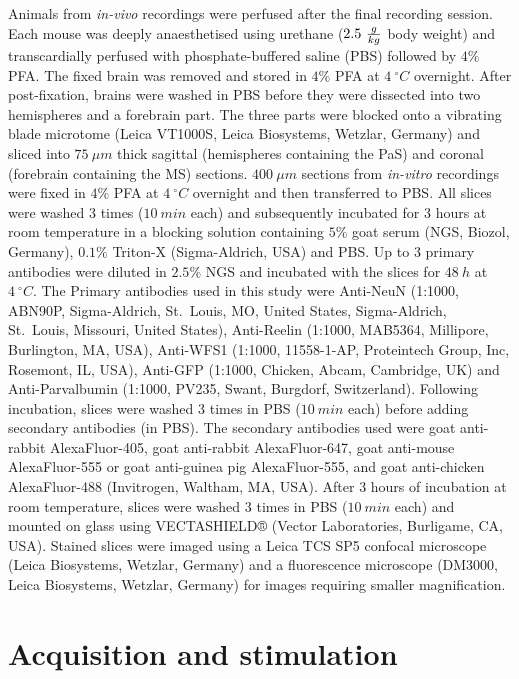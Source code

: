 \documentclass[
  12pt,
  a4paper,
  openany]{book}
\begin{document}
Animals from \emph{in-vivo} recordings were perfused after the final recording session. Each mouse was deeply anaesthetised using urethane (\(2.5\ \frac{g}{kg} \textstyle\) body weight) and transcardially perfused with phosphate-buffered saline (PBS) followed by \(4\%\) PFA. The fixed brain was removed and stored in \(4\%\) PFA at \(4\ ^{\circ}C\) overnight. After post-fixation, brains were washed in PBS before they were dissected into two hemispheres and a forebrain part. The three parts were blocked onto a vibrating blade microtome (Leica VT1000S, Leica Biosystems, Wetzlar, Germany) and sliced into \(75\ \mu m\) thick sagittal (hemispheres containing the PaS) and coronal (forebrain containing the MS) sections. \(400\ \mu m\) sections from \emph{in-vitro} recordings were fixed in \(4\%\) PFA at \(4\ ^{\circ}C\) overnight and then transferred to PBS. All slices were washed \(3\) times (\(10\ min\) each) and subsequently incubated for \(3\) hours at room temperature in a blocking solution containing \(5\%\) goat serum (NGS, Biozol, Germany), \(0.1\%\) Triton-X (Sigma-Aldrich, USA) and PBS. Up to \(3\) primary antibodies were diluted in \(2.5\%\) NGS and incubated with the slices for \(48\ h\) at \(4\ ^{\circ}C\). The Primary antibodies used in this study were Anti-NeuN (1:1000, ABN90P, Sigma-Aldrich, St.~Louis, MO, United States, Sigma-Aldrich, St.~Louis, Missouri, United States), Anti-Reelin (1:1000, MAB5364, Millipore, Burlington, MA, USA), Anti-WFS1 (1:1000, 11558-1-AP, Proteintech Group, Inc, Rosemont, IL, USA), Anti-GFP (1:1000, Chicken, Abcam, Cambridge, UK) and Anti-Parvalbumin (1:1000, PV235, Swant, Burgdorf, Switzerland). Following incubation, slices were washed \(3\) times in PBS (\(10\ min\) each) before adding secondary antibodies (in PBS). The secondary antibodies used were goat anti-rabbit AlexaFluor-405, goat anti-rabbit AlexaFluor-647, goat anti-mouse AlexaFluor-555 or goat anti-guinea pig AlexaFluor-555, and goat anti-chicken AlexaFluor-488 (Invitrogen, Waltham, MA, USA). After \(3\) hours of incubation at room temperature, slices were washed \(3\) times in PBS (\(10\ min\) each) and mounted on glass using VECTASHIELD® (Vector Laboratories, Burligame, CA, USA). Stained slices were imaged using a Leica TCS SP5 confocal microscope (Leica Biosystems, Wetzlar, Germany) and a fluorescence microscope (DM3000, Leica Biosystems, Wetzlar, Germany) for images requiring smaller magnification.

\hypertarget{acquisition-and-stimulation}{%
\section{Acquisition and stimulation}\label{acquisition-and-stimulation}}
\end{document}
